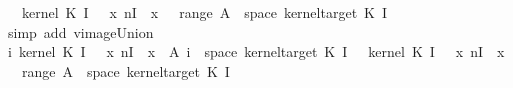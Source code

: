 \begin{isabellebody}
\ {\isachardoublequoteopen}{\isachardot}{\kern0pt}{\isachardot}{\kern0pt}{\isachardot}{\kern0pt}\ {\isacharequal}{\kern0pt}\ kernel\ {\isacharparenleft}{\kern0pt}K\ {\isacharparenleft}{\kern0pt}I\ {}{\isacharparenright}{\kern0pt}{\isacharparenright}{\kern0pt}\ {\isasymomega}\ {\isacharparenleft}{\kern0pt}{\isacharparenleft}{\kern0pt}{\isasymlambda}x{\isachardot}{\kern0pt}\ {\isasymlambda}n{\isasymin}{\isacharbraceleft}{\kern0pt}I\ {}{\isacharbraceright}{\kern0pt}{\isachardot}{\kern0pt}\ x{\isacharparenright}{\kern0pt}\ {\isacharminus}{\kern0pt}{\isacharbackquote}{\kern0pt}\ {\isasymUnion}\ {\isacharparenleft}{\kern0pt}range\ A{\isacharparenright}{\kern0pt}\ {\isasyminter}\ space\ {\isacharparenleft}{\kern0pt}kernel{\isacharunderscore}{\kern0pt}target\ {\isacharparenleft}{\kern0pt}K\ {\isacharparenleft}{\kern0pt}I\ {}{\isacharparenright}{\kern0pt}{\isacharparenright}{\kern0pt}{\isacharparenright}{\kern0pt}{\isacharparenright}{\kern0pt}{\isachardoublequoteclose}\isanewline
\ \ \ \ \ \ \isamarkupfalse%
\ {\isacharparenleft}{\kern0pt}simp\ add{\isacharcolon}{\kern0pt}\ vimage{\isacharunderscore}{\kern0pt}Union{\isacharparenright}{\kern0pt}\isanewline
\ \ \ \ \isamarkupfalse%
\ \isamarkupfalse%
\ {\isachardoublequoteopen}{\isacharparenleft}{\kern0pt}{\isasymSum}i{\isachardot}{\kern0pt}\ kernel\ {\isacharparenleft}{\kern0pt}K\ {\isacharparenleft}{\kern0pt}I\ {}{\isacharparenright}{\kern0pt}{\isacharparenright}{\kern0pt}\ {\isasymomega}\ {\isacharparenleft}{\kern0pt}{\isacharparenleft}{\kern0pt}{\isasymlambda}x{\isachardot}{\kern0pt}\ {\isasymlambda}n{\isasymin}{\isacharbraceleft}{\kern0pt}I\ {}{\isacharbraceright}{\kern0pt}{\isachardot}{\kern0pt}\ x{\isacharparenright}{\kern0pt}\ {\isacharminus}{\kern0pt}{\isacharbackquote}{\kern0pt}\ A\ i\ {\isasyminter}\ space\ {\isacharparenleft}{\kern0pt}kernel{\isacharunderscore}{\kern0pt}target\ {\isacharparenleft}{\kern0pt}K\ {\isacharparenleft}{\kern0pt}I\ {}{\isacharparenright}{\kern0pt}{\isacharparenright}{\kern0pt}{\isacharparenright}{\kern0pt}{\isacharparenright}{\kern0pt}{\isacharparenright}{\kern0pt}\ {\isacharequal}{\kern0pt}\ kernel\ {\isacharparenleft}{\kern0pt}K\ {\isacharparenleft}{\kern0pt}I\ {}{\isacharparenright}{\kern0pt}{\isacharparenright}{\kern0pt}\ {\isasymomega}\ {\isacharparenleft}{\kern0pt}{\isacharparenleft}{\kern0pt}{\isasymlambda}x{\isachardot}{\kern0pt}\ {\isasymlambda}n{\isasymin}{\isacharbraceleft}{\kern0pt}I\ {}{\isacharbraceright}{\kern0pt}{\isachardot}{\kern0pt}\ x{\isacharparenright}{\kern0pt}\ {\isacharminus}{\kern0pt}{\isacharbackquote}{\kern0pt}\ {\isasymUnion}\ {\isacharparenleft}{\kern0pt}range\ A{\isacharparenright}{\kern0pt}\ {\isasyminter}\ space\ {\isacharparenleft}{\kern0pt}kernel{\isacharunderscore}{\kern0pt}target\ {\isacharparenleft}{\kern0pt}K\ {\isacharparenleft}{\kern0pt}I\ {}{\isacharparenright}{\kern0pt}{\isacharparenright}{\kern0pt}{\isacharparenright}{\kern0pt}{\isacharparenright}{\kern0pt}{\isachardoublequoteclose}\isanewline

\end{isabellebody}

